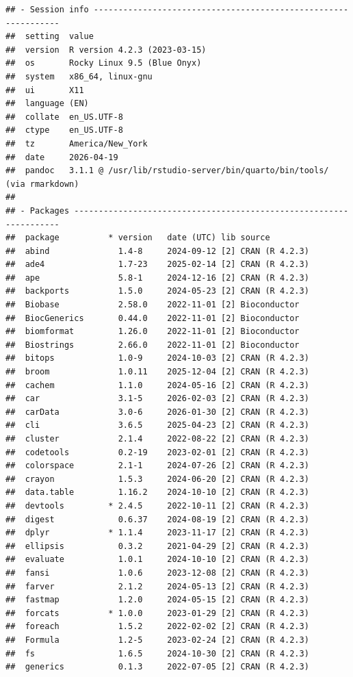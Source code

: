 \documentclass[
]{article}
\begin{document}
\begin{verbatim}
## - Session info ---------------------------------------------------------------
##  setting  value
##  version  R version 4.2.3 (2023-03-15)
##  os       Rocky Linux 9.5 (Blue Onyx)
##  system   x86_64, linux-gnu
##  ui       X11
##  language (EN)
##  collate  en_US.UTF-8
##  ctype    en_US.UTF-8
##  tz       America/New_York
##  date     2026-04-19
##  pandoc   3.1.1 @ /usr/lib/rstudio-server/bin/quarto/bin/tools/ (via rmarkdown)
## 
## - Packages -------------------------------------------------------------------
##  package          * version   date (UTC) lib source
##  abind              1.4-8     2024-09-12 [2] CRAN (R 4.2.3)
##  ade4               1.7-23    2025-02-14 [2] CRAN (R 4.2.3)
##  ape                5.8-1     2024-12-16 [2] CRAN (R 4.2.3)
##  backports          1.5.0     2024-05-23 [2] CRAN (R 4.2.3)
##  Biobase            2.58.0    2022-11-01 [2] Bioconductor
##  BiocGenerics       0.44.0    2022-11-01 [2] Bioconductor
##  biomformat         1.26.0    2022-11-01 [2] Bioconductor
##  Biostrings         2.66.0    2022-11-01 [2] Bioconductor
##  bitops             1.0-9     2024-10-03 [2] CRAN (R 4.2.3)
##  broom              1.0.11    2025-12-04 [2] CRAN (R 4.2.3)
##  cachem             1.1.0     2024-05-16 [2] CRAN (R 4.2.3)
##  car                3.1-5     2026-02-03 [2] CRAN (R 4.2.3)
##  carData            3.0-6     2026-01-30 [2] CRAN (R 4.2.3)
##  cli                3.6.5     2025-04-23 [2] CRAN (R 4.2.3)
##  cluster            2.1.4     2022-08-22 [2] CRAN (R 4.2.3)
##  codetools          0.2-19    2023-02-01 [2] CRAN (R 4.2.3)
##  colorspace         2.1-1     2024-07-26 [2] CRAN (R 4.2.3)
##  crayon             1.5.3     2024-06-20 [2] CRAN (R 4.2.3)
##  data.table         1.16.2    2024-10-10 [2] CRAN (R 4.2.3)
##  devtools         * 2.4.5     2022-10-11 [2] CRAN (R 4.2.3)
##  digest             0.6.37    2024-08-19 [2] CRAN (R 4.2.3)
##  dplyr            * 1.1.4     2023-11-17 [2] CRAN (R 4.2.3)
##  ellipsis           0.3.2     2021-04-29 [2] CRAN (R 4.2.3)
##  evaluate           1.0.1     2024-10-10 [2] CRAN (R 4.2.3)
##  fansi              1.0.6     2023-12-08 [2] CRAN (R 4.2.3)
##  farver             2.1.2     2024-05-13 [2] CRAN (R 4.2.3)
##  fastmap            1.2.0     2024-05-15 [2] CRAN (R 4.2.3)
##  forcats          * 1.0.0     2023-01-29 [2] CRAN (R 4.2.3)
##  foreach            1.5.2     2022-02-02 [2] CRAN (R 4.2.3)
##  Formula            1.2-5     2023-02-24 [2] CRAN (R 4.2.3)
##  fs                 1.6.5     2024-10-30 [2] CRAN (R 4.2.3)
##  generics           0.1.3     2022-07-05 [2] CRAN (R 4.2.3)

\end{verbatim}
\end{document}
